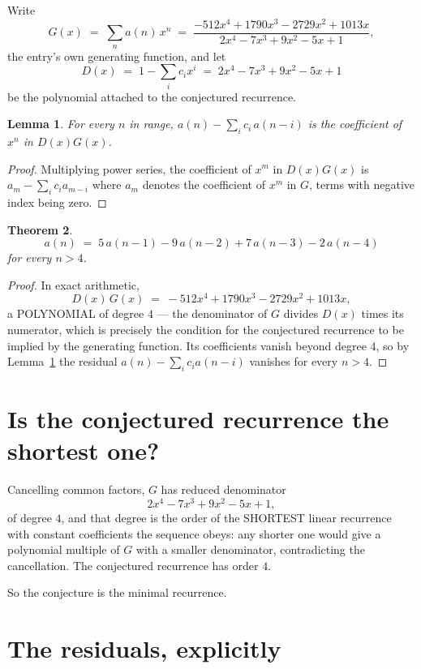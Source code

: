 \documentclass[11pt,a4paper]{article}
\theoremstyle{plain}
\newtheorem{theorem}{Theorem}
\newtheorem{lemma}[theorem]{Lemma}
\theoremstyle{definition}
\begin{document}
Write
\[
G(x)\;=\;\sum_{n}a(n)\,x^{n}\;=\;\frac{- 512 x^{4} + 1790 x^{3} - 2729 x^{2} + 1013 x}{2 x^{4} - 7 x^{3} + 9 x^{2} - 5 x + 1},
\]
the entry's own generating function, and let
\[
D(x)\;=\;1-\sum_i c_i x^{i}\;=\;2 x^{4} - 7 x^{3} + 9 x^{2} - 5 x + 1
\]
be the polynomial attached to the conjectured recurrence.

\begin{lemma}\label{lem:key}
For every $n$ in range, $a(n)-\sum_i c_i\,a(n-i)$ is the coefficient of $x^{n}$ in
$D(x)G(x)$.
\end{lemma}

\begin{proof}
Multiplying power series, the coefficient of $x^{m}$ in $D(x)G(x)$ is
$a_m-\sum_i c_i a_{m-i}$ where $a_m$ denotes the coefficient of $x^{m}$ in $G$, terms with
negative index being zero.
\end{proof}

\begin{theorem}
\[
a(n)\;=\;5\,a(n-1) - 9\,a(n-2) + 7\,a(n-3) - 2\,a(n-4)
\]
for every $n>4$.
\end{theorem}

\begin{proof}
In exact arithmetic,
\[
D(x)\,G(x)\;=\;- 512 x^{4} + 1790 x^{3} - 2729 x^{2} + 1013 x,
\]
a POLYNOMIAL of degree $4$ --- the denominator of $G$ divides $D(x)$ times its numerator,
which is precisely the condition for the conjectured recurrence to be implied by the
generating function. Its coefficients vanish beyond degree $4$, so by
Lemma~\ref{lem:key} the residual $a(n)-\sum_ic_ia(n-i)$ vanishes for every
$n>4$.
\end{proof}

\section{Is the conjectured recurrence the shortest one?}

Cancelling common factors, $G$ has reduced denominator
\[
2 x^{4} - 7 x^{3} + 9 x^{2} - 5 x + 1,
\]
of degree $4$, and that degree is the order of the SHORTEST linear recurrence with
constant coefficients the sequence obeys: any shorter one would give a polynomial multiple of
$G$ with a smaller denominator, contradicting the cancellation. The conjectured recurrence has
order $4$.

So the conjecture is the minimal recurrence.

\section{The residuals, explicitly}
\end{document}
